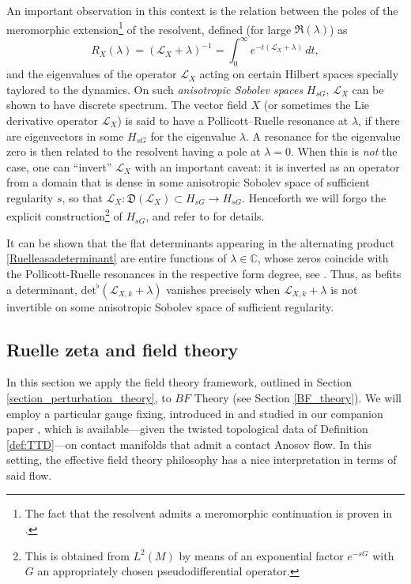 \documentclass[reqno]{amsart}
\theoremstyle{definition}
\theoremstyle{remark}
\renewcommand{\L}{\mathcal{L}}
\renewcommand{\det}{\mathrm{det}^\flat}
\begin{document}
\begin{rmk}\label{rem:Anisotropic}
An important observation in this context is the relation between the poles of the meromorphic extension\footnote{The fact that the resolvent admits a meromorphic continuation is proven in \cite{faure_sjostrand,DyatlovZworski_RuelleZeta}.} of the resolvent, defined (for large $\Re(\lambda)$) as
\[
R_X(\lambda)=(\L_X+\lambda)^{-1} = \int_0^\infty e^{-t(\L_X+\lambda)}\,dt,
\] 
and the eigenvalues of the operator $\L_X$ acting on certain Hilbert spaces specially taylored to the dynamics. On such \emph{anisotropic Sobolev spaces} $H_{sG}$, $\L_X$ can be shown to have discrete spectrum. The vector field $X$ (or sometimes the Lie derivative operator $\L_X$) is said to have a Pollicott--Ruelle resonance at $\lambda$, if there are eigenvectors in some $H_{sG}$ for the eigenvalue $\lambda$. A resonance for the eigenvalue zero is then related to the resolvent having a pole at $\lambda=0$. When this is \emph{not} the case, one can ``invert'' $\L_X$ with an important caveat: it is inverted as an operator from a domain that is dense in some anisotropic Sobolev space of sufficient regularity $s$, so that $\L_X\colon \mathfrak{D}(\L_X) \subset H_{sG} \to H_{sG}$. Henceforth we will forgo the explicit construction\footnote{This is obtained from $L^2(M)$ by means of an exponential factor $e^{-sG}$ with $G$ an appropriately chosen pseudodifferential operator.} of $H_{sG}$, and refer to \cite{faure_sjostrand,DyatlovZworski_RuelleZeta} for details.
\end{rmk}

\begin{rmk}
\label{entire_function}
It can be shown that the flat determinants appearing in the alternating product \eqref{Ruelleasadeterminant} are entire functions of $\lambda \in \mathbb{C}$, whose zeros coincide with the Pollicott-Ruelle resonances in the respective form degree, see \cite{DyatlovZworski_RuelleZeta}. Thus, as befits a determinant, ${\det} (\L_{X,k} + \lambda)$ vanishes precisely when $\L_{X,k} + \lambda$ is not invertible on some anisotropic Sobolev space of sufficient regularity.
\end{rmk}

\subsection{Ruelle zeta and field theory}
\label{section_ruelle_zeta_perturbative}

In this section we apply the field theory framework, outlined in Section \ref{section_perturbation_theory}, to $BF$ Theory (see Section \ref{BF_theory}). We will employ a particular gauge fixing, introduced in \cite{hadfield_kandel_schiavina} and studied in our companion paper \cite{Schiavina_Stucker1}, which is available---given the twisted topological data of Definition \ref{def:TTD}---on contact manifolds that admit a contact Anosov flow. In this setting, the effective field theory philosophy has a nice interpretation in terms of said flow. 
\end{document}

